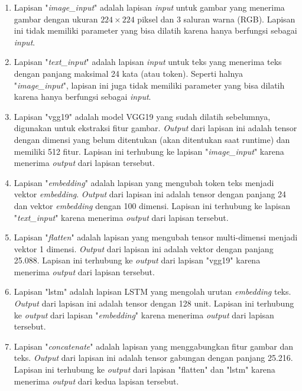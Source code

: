 \begin{enumerate}
  \item Lapisan "\textit{image\_input}" adalah lapisan \textit{input} untuk gambar yang menerima gambar dengan ukuran $224 \times 224$ piksel dan 3 saluran warna (RGB). Lapisan ini tidak memiliki parameter yang bisa dilatih karena hanya berfungsi sebagai \textit{input}.

  \item Lapisan "\textit{text\_input}" adalah lapisan \textit{input} untuk teks yang menerima teks dengan panjang maksimal 24 kata (atau token). Seperti halnya "\textit{image\_input}", lapisan ini juga tidak memiliki parameter yang bisa dilatih karena hanya berfungsi sebagai \textit{input}.

  \item Lapisan "vgg19" adalah model VGG19 yang sudah dilatih sebelumnya, digunakan untuk ekstraksi fitur gambar. \textit{Output} dari lapisan ini adalah tensor dengan dimensi yang belum ditentukan (akan ditentukan saat runtime) dan memiliki 512 fitur. Lapisan ini terhubung ke lapisan "\textit{image\_input}" karena menerima \textit{output} dari lapisan tersebut.

  \item Lapisan "\textit{embedding}" adalah lapisan yang mengubah token teks menjadi vektor \textit{embedding}. \textit{Output} dari lapisan ini adalah tensor dengan panjang 24 dan vektor \textit{embedding} dengan 100 dimensi. Lapisan ini terhubung ke lapisan "\textit{text\_input}" karena menerima \textit{output} dari lapisan tersebut.

  \item Lapisan "\textit{flatten}" adalah lapisan yang mengubah tensor multi-dimensi menjadi vektor 1 dimensi. \textit{Output} dari lapisan ini adalah vektor dengan panjang 25.088. Lapisan ini terhubung ke \textit{output} dari lapisan "vgg19" karena menerima \textit{output} dari lapisan tersebut.

  \item Lapisan "lstm" adalah lapisan LSTM yang mengolah urutan \textit{embedding} teks. \textit{Output} dari lapisan ini adalah tensor dengan 128 unit. Lapisan ini terhubung ke \textit{output} dari lapisan "\textit{embedding}" karena menerima \textit{output} dari lapisan tersebut.

  \item Lapisan "\textit{concatenate}" adalah lapisan yang menggabungkan fitur gambar dan teks. \textit{Output} dari lapisan ini adalah tensor gabungan dengan panjang 25.216. Lapisan ini terhubung ke \textit{output} dari lapisan "flatten" dan "lstm" karena menerima \textit{output} dari kedua lapisan tersebut.


\end{enumerate}
